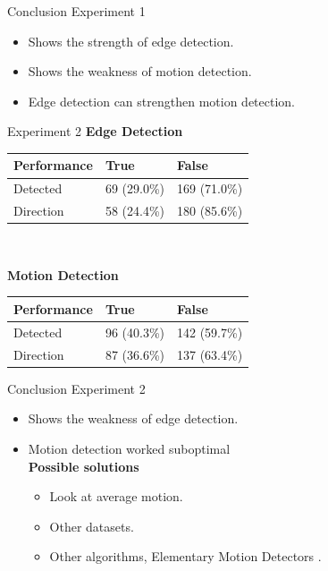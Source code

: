 \documentclass{beamer}
\begin{document}
\begin{frame}
\begin{block}{Conclusion Experiment 1}
\begin{itemize}
\item Shows the strength of edge detection.
\item Shows the weakness of motion detection.
\item Edge detection can strengthen motion detection.
\end{itemize}
\end{block}
\end{frame}

\begin{frame}
\begin{block}{Experiment 2}
\textbf{Edge Detection}\\\vspace{0.1cm}

\begin{tabular}{| l | l | l |}
\hline
\textbf{Performance} & True & False\\
\hline
Detected  & 69 (29.0\%) & 169 (71.0\%)\\
\hline
Direction & 58 (24.4\%) & 180 (85.6\%) \\
\hline
\end{tabular}\\\vspace{0.1cm}

\textbf{Motion Detection}\\\vspace{0.1cm}

\begin{tabular}{| l | l | l |}
\hline
\textbf{Performance} & True & False\\
\hline
Detected  & 96 (40.3\%) & 142 (59.7\%)\\
\hline
Direction & 87 (36.6\%) & 137 (63.4\%) \\
\hline
\end{tabular}
\end{block}

\end{frame}

\begin{frame}
\begin{block}{Conclusion Experiment 2}
\begin{itemize}
\item Shows the weakness of edge detection.
\item Motion detection worked suboptimal\\\textbf{Possible solutions}
\begin{itemize}
\item Look at average motion.
\item Other datasets.
\item Other algorithms, Elementary Motion Detectors \cite{Gerke2011}.
\end{itemize}
\end{itemize}
\end{block}
\end{frame}
\end{document}
